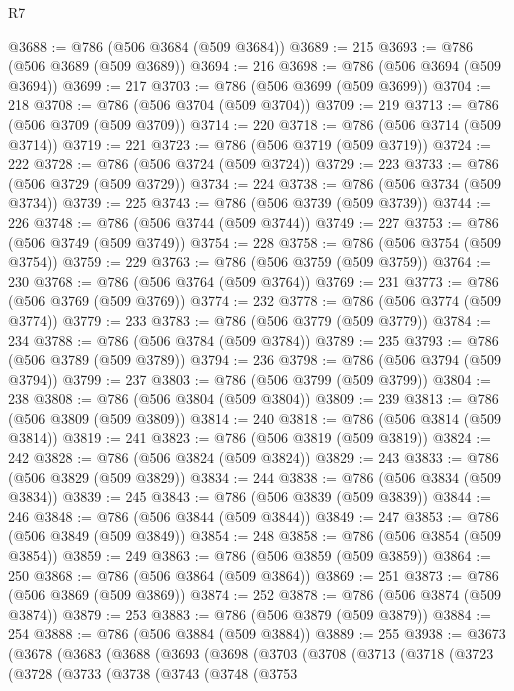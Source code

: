 \begin{lexlean}{R7}
\begin{coremodule}
@3688 := @786 (@506 @3684 (@509 @3684))
@3689 := 215
@3693 := @786 (@506 @3689 (@509 @3689))
@3694 := 216
@3698 := @786 (@506 @3694 (@509 @3694))
@3699 := 217
@3703 := @786 (@506 @3699 (@509 @3699))
@3704 := 218
@3708 := @786 (@506 @3704 (@509 @3704))
@3709 := 219
@3713 := @786 (@506 @3709 (@509 @3709))
@3714 := 220
@3718 := @786 (@506 @3714 (@509 @3714))
@3719 := 221
@3723 := @786 (@506 @3719 (@509 @3719))
@3724 := 222
@3728 := @786 (@506 @3724 (@509 @3724))
@3729 := 223
@3733 := @786 (@506 @3729 (@509 @3729))
@3734 := 224
@3738 := @786 (@506 @3734 (@509 @3734))
@3739 := 225
@3743 := @786 (@506 @3739 (@509 @3739))
@3744 := 226
@3748 := @786 (@506 @3744 (@509 @3744))
@3749 := 227
@3753 := @786 (@506 @3749 (@509 @3749))
@3754 := 228
@3758 := @786 (@506 @3754 (@509 @3754))
@3759 := 229
@3763 := @786 (@506 @3759 (@509 @3759))
@3764 := 230
@3768 := @786 (@506 @3764 (@509 @3764))
@3769 := 231
@3773 := @786 (@506 @3769 (@509 @3769))
@3774 := 232
@3778 := @786 (@506 @3774 (@509 @3774))
@3779 := 233
@3783 := @786 (@506 @3779 (@509 @3779))
@3784 := 234
@3788 := @786 (@506 @3784 (@509 @3784))
@3789 := 235
@3793 := @786 (@506 @3789 (@509 @3789))
@3794 := 236
@3798 := @786 (@506 @3794 (@509 @3794))
@3799 := 237
@3803 := @786 (@506 @3799 (@509 @3799))
@3804 := 238
@3808 := @786 (@506 @3804 (@509 @3804))
@3809 := 239
@3813 := @786 (@506 @3809 (@509 @3809))
@3814 := 240
@3818 := @786 (@506 @3814 (@509 @3814))
@3819 := 241
@3823 := @786 (@506 @3819 (@509 @3819))
@3824 := 242
@3828 := @786 (@506 @3824 (@509 @3824))
@3829 := 243
@3833 := @786 (@506 @3829 (@509 @3829))
@3834 := 244
@3838 := @786 (@506 @3834 (@509 @3834))
@3839 := 245
@3843 := @786 (@506 @3839 (@509 @3839))
@3844 := 246
@3848 := @786 (@506 @3844 (@509 @3844))
@3849 := 247
@3853 := @786 (@506 @3849 (@509 @3849))
@3854 := 248
@3858 := @786 (@506 @3854 (@509 @3854))
@3859 := 249
@3863 := @786 (@506 @3859 (@509 @3859))
@3864 := 250
@3868 := @786 (@506 @3864 (@509 @3864))
@3869 := 251
@3873 := @786 (@506 @3869 (@509 @3869))
@3874 := 252
@3878 := @786 (@506 @3874 (@509 @3874))
@3879 := 253
@3883 := @786 (@506 @3879 (@509 @3879))
@3884 := 254
@3888 := @786 (@506 @3884 (@509 @3884))
@3889 := 255
@3938 := @3673
    (@3678
      (@3683
        (@3688
          (@3693
            (@3698
              (@3703
                (@3708
                  (@3713
                    (@3718
                      (@3723
                        (@3728
                          (@3733
                            (@3738
                              (@3743
                                (@3748
                                  (@3753

\end{coremodule}
\end{lexlean}

